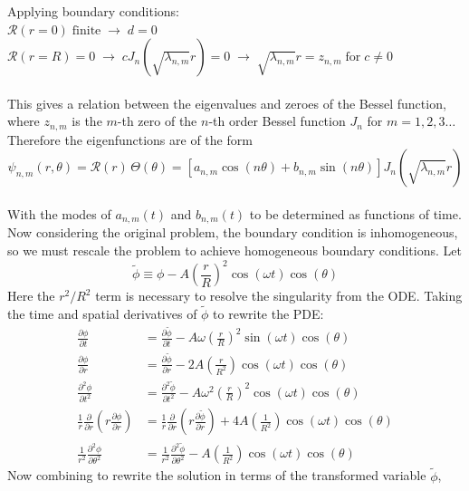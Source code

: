\documentclass{homework}
\begin{document}
\noindent
Applying boundary conditions: \\
\noindent $\mathcal{R}(r = 0) \; \textrm{finite} \; \rightarrow \; d = 0$ \\
\noindent $\mathcal{R}(r = R) = 0 \; \rightarrow \; c J_n (\sqrt{\lambda_{n,m}} r) = 0 \; \rightarrow \; \sqrt{\lambda_{n,m}} r = z_{n,m} \; \textrm{for} \; c \neq 0$ \\ \\ \noindent
This gives a relation between the eigenvalues and zeroes of the Bessel function,  where $z_{n,m}$ is the $m$-th zero of the $n$-th order Bessel function $J_n$ for $m = 1,2,3 \dots$ Therefore the eigenfunctions  are of the form 
\[ \psi_{n,m} (r, \theta) = \mathcal{R}(r) \, \Theta(\theta) = [a_{n,m} \cos(n \theta) + b_{n,m} \sin(n \theta)] J_n (\sqrt{\lambda_{n,m}} r) \]
\\ \noindent
With the modes of $a_{n,m}(t)$ and $b_{n,m}(t)$ to be determined as functions of time. Now considering the original problem, the boundary condition is inhomogeneous, so we must rescale the problem to achieve homogeneous boundary conditions. Let
\[ \tilde{\phi} \equiv \phi - A \left(\frac{r}{R} \right)^2 \cos(\omega t) \cos(\theta) \]
\noindent
Here the $r^2 / R^2$ term is necessary to resolve the singularity from the ODE. Taking the time and spatial derivatives of $\tilde{\phi}$ to rewrite the PDE:
\begin{align*}
\frac{ \partial \phi}{\partial t} &= \frac{ \partial \tilde{\phi}}{\partial t} - A \omega \left(\frac{r}{R} \right)^2 \sin(\omega t) \cos(\theta) \\
\frac{ \partial \phi}{\partial r} &= \frac{ \partial \tilde{\phi}}{\partial r} - 2 A \left(\frac{r}{R^2}\right) \cos(\omega t) \cos(\theta) \\
\frac{ \partial^2 \phi}{\partial t^2} &= \frac{ \partial^2 \tilde{\phi}}{\partial t^2} - A \omega^2 \left(\frac{r}{R} \right)^2 \cos(\omega t) \cos(\theta) \\
\frac{1}{r} \frac{\partial}{\partial r} (r \frac{\partial \phi}{\partial r}) &= \frac{1}{r} \frac{\partial}{\partial r} (r \frac{\partial \tilde{\phi}}{\partial r}) + 4 A \left(\frac{1}{R^2}\right) \cos(\omega t) \cos(\theta) \\
\frac{1}{r^2} \frac{\partial^2 \phi }{\partial \theta^2} &= \frac{1}{r^2} \frac{\partial^2 \tilde{\phi} }{\partial \theta^2} - A \left(\frac{1}{R^2}\right) \cos(\omega t) \cos(\theta)
\end{align*}
\noindent
Now combining to rewrite the solution in terms of the transformed variable $\tilde{\phi}$,
\end{document}
